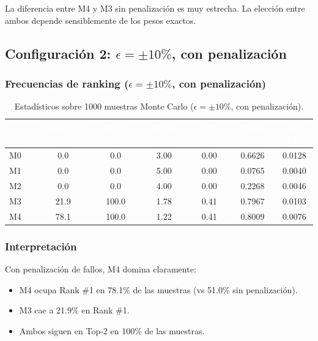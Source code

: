 \documentclass[12pt,a4paper,oneside]{book}
\begin{document}
La diferencia entre M4 y M3 sin penalización es muy estrecha. La elección entre ambos depende sensiblemente de los pesos exactos.

\subsection{Configuración 2: $\epsilon = \pm 10\%$, con penalización}

\subsubsection*{Frecuencias de ranking ($\epsilon = \pm 10\%$, con penalización)}
\begin{table}[H]
\centering
\caption{Estadísticos sobre 1000 muestras Monte Carlo ($\epsilon = \pm 10\%$, con penalización).}
\renewcommand{\arraystretch}{1.3}
\begin{tabular}{lcccccc}
\toprule
\rowcolor{primary}
\textcolor{white}{\textbf{Mét.}} & \textcolor{white}{\textbf{Rank \#1 (\%)}} & \textcolor{white}{\textbf{Top-2 (\%)}} & \textcolor{white}{\textbf{Mean rank}} & \textcolor{white}{\textbf{SD rank}} & \textcolor{white}{\textbf{Mean CC}} & \textcolor{white}{\textbf{SD CC}} \\
\midrule
M0 & 0.0 & 0.0 & 3.00 & 0.00 & 0.6626 & 0.0128 \\
M1 & 0.0 & 0.0 & 5.00 & 0.00 & 0.0765 & 0.0040 \\
M2 & 0.0 & 0.0 & 4.00 & 0.00 & 0.2268 & 0.0046 \\
M3 & 21.9 & 100.0 & 1.78 & 0.41 & 0.7967 & 0.0103 \\
M4 & 78.1 & 100.0 & 1.22 & 0.41 & 0.8009 & 0.0076 \\
\bottomrule
\end{tabular}
\end{table}

\subsubsection*{Interpretación}

Con penalización de fallos, M4 domina claramente:
\begin{itemize}
    \item M4 ocupa Rank \#1 en 78.1\% de las muestras (vs 51.0\% sin penalización).
    \item M3 cae a 21.9\% en Rank \#1.
    \item Ambos siguen en Top-2 en 100\% de las muestras.
\end{itemize}
\end{document}
